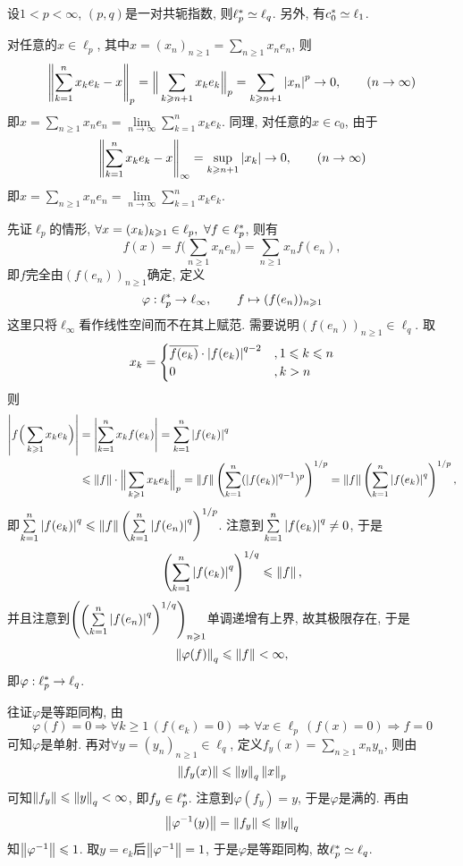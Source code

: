 	\begin{Proposition}
		设$ 1<p<\infty $, $ (p,q) $是一对共轭指数, 则$ \ell_p^{*}\simeq\ell_q $. 另外, 有$ c_0^{*}\simeq\ell_1 $.
	\end{Proposition}
	\begin{Proof}
		对任意的$ x\in\ell_p $, 其中$ x=(x_n)_{n\geqslant 1}=\sum\limits_{n\geqslant 1}x_ne_n $, 则
		\[
		\left\| \sum_{k=1}^nx_ke_k-x \right\|_p=\Big\| \sum_{k\geqslant n+1}x_ke_k \Big\|_p=\sum_{k\geqslant n+1}\left| x_n \right| ^p\to 0,\qquad(n\to\infty)
		\]
		即$ x=\sum\limits_{n\geqslant 1}x_ne_n=\lim\limits_{n\to\infty}\sum\limits_{k=1}^nx_ke_k $. 同理, 对任意的$ x\in c_0 $, 由于
		\[
		\left\| \sum_{k=1}^nx_ke_k-x \right\|_\infty=\sup_{k\geqslant n+1}\left| x_k \right| \to 0,\qquad(n\to\infty)
		\]
		即$ x=\sum\limits_{n\geqslant 1}x_ne_n=\lim\limits_{n\to\infty}\sum\limits_{k=1}^nx_ke_k $.
		
		先证$ \ell_p $的情形, $ \forall x=(x_k)_{k\geqslant 1}\in\ell_p,\ \forall f\in\Star{\ell_p} $, 则有
		\[
		f(x)=f\Big( \sum_{n\geqslant 1}x_ne_n \Big)=\sum_{n\geqslant 1}x_nf(e_n),
		\]
		即$ f $完全由$ (f(e_n))_{n\geqslant 1} $确定, 定义
		\[
		\varphi : \ell_p^{*}\to\ell_\infty,\qquad f\mapsto(f(e_n))_{n\geqslant 1}
		\]
		这里只将$ \ell_\infty $看作线性空间而不在其上赋范. 需要说明$ (f(e_n))_{n\geqslant 1}\in\ell_q $. 取
		\[
		x_k=\begin{cases}
		\overline{f(e_k)}\cdot\left| f(e_k) \right| ^{q-2} & ,1\leqslant k\leqslant n\\
		0 & , k>n\\
		\end{cases}
		\]
		则
		\[
		\begin{aligned}
		\left| f\Big(\sum_{k\geqslant 1}x_ke_k\Big) \right| &=\left| \sum_{k=1}^nx_kf(e_k) \right| =\sum_{k=1}^n\left| f(e_k) \right| ^q\\
		&\leqslant\left\| f \right\|\cdot\Big\| \sum_{k\geqslant 1}x_ke_k \Big\|_p=\left\| f \right\|\left(\sum_{k=1}^n(\left| f(e_k) \right| ^{q-1})^p\right)^{1/p}=\left\| f \right\|\left(\sum_{k=1}^n\left| f(e_k) \right| ^q\right)^{1/p},
		\end{aligned}
		\]
		即$ \sum\limits_{k=1}^n\left| f(e_k) \right| ^q\leqslant\left\| f \right\|\left(\sum\limits_{k=1}^n\left| f(e_n) \right| ^q\right)^{1/p} $. 注意到$ \sum\limits_{k=1}^n\left| f(e_k) \right| ^q\ne 0 $, 于是
		\[
		\left(\sum_{k=1}^n\left| f(e_k) \right| ^q\right)^{1/q}\leqslant\left\| f \right\|,
		\]
		并且注意到$ \left(\left(\sum\limits_{k=1}^n\left| f(e_n) \right| ^q\right)^{1/q}\right)_{n\geqslant 1} $单调递增有上界, 故其极限存在, 于是
		\[
		\left\| \varphi(f) \right\|_q\leqslant\left\| f \right\|<\infty,
		\]
		即$ \varphi : \ell_p^{*}\to\ell_q $.
		
		往证$ \varphi $是等距同构, 由
		\[
		\varphi(f)=0\Longrightarrow\forall k\geqslant 1\,(f(e_k)=0)\Longrightarrow\forall x\in\ell_p\,(f(x)=0)\Longrightarrow f=0
		\]
		可知$ \varphi $是单射. 再对$ \forall y=(y_n)_{n\geqslant 1}\in\ell_q $, 定义$ f_y(x)=\sum\limits_{n\geqslant 1}x_ny_n $, 则由
		\[
		\left\| f_y(x) \right\|\leqslant\left\| y \right\|_q\left\| x \right\|_p
		\]
		可知$ \left\| f_y \right\|\leqslant\left\| y \right\|_q<\infty $, 即$ f_y\in\ell_p^{*} $. 注意到$ \varphi(f_y)=y $, 于是$ \varphi $是满的. 再由
		\[
		\left\| \varphi^{-1}(y) \right\|=\left\| f_y \right\|\leqslant\left\| y \right\|_q
		\]
		知$ \left\| \varphi^{-1} \right\|\leqslant 1 $. 取$ y=e_k $后$ \left\| \varphi^{-1} \right\|=1 $, 于是$ \varphi $是等距同构, 故$ \ell_p^{*}\simeq\ell_q $.
		

\end{Proof}
